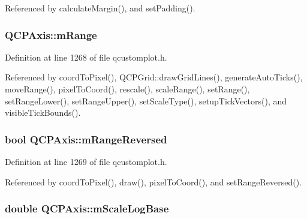 Referenced by calculate\+Margin(), and set\+Padding().

\hypertarget{class_q_c_p_axis_a1ee36773c49062d751560e11f90845f7}{}
\subsubsection[{m\+Range}]{ Q\+C\+P\+Axis\+::m\+Range\hspace{0.3cm}{\ttfamily [protected]}}\label{class_q_c_p_axis_a1ee36773c49062d751560e11f90845f7}


Definition at line 1268 of file qcustomplot.\+h.



Referenced by coord\+To\+Pixel(), Q\+C\+P\+Grid\+::draw\+Grid\+Lines(), generate\+Auto\+Ticks(), move\+Range(), pixel\+To\+Coord(), rescale(), scale\+Range(), set\+Range(), set\+Range\+Lower(), set\+Range\+Upper(), set\+Scale\+Type(), setup\+Tick\+Vectors(), and visible\+Tick\+Bounds().

\hypertarget{class_q_c_p_axis_a5cb034f57aa3d773a9ca55a0931dbf7b}{}
\subsubsection[{m\+Range\+Reversed}]{\setlength{\rightskip}{0pt plus 5cm}bool Q\+C\+P\+Axis\+::m\+Range\+Reversed\hspace{0.3cm}{\ttfamily [protected]}}\label{class_q_c_p_axis_a5cb034f57aa3d773a9ca55a0931dbf7b}


Definition at line 1269 of file qcustomplot.\+h.



Referenced by coord\+To\+Pixel(), draw(), pixel\+To\+Coord(), and set\+Range\+Reversed().

\hypertarget{class_q_c_p_axis_abc727ddb4af745151755d1b5e60d03c3}{}
\subsubsection[{m\+Scale\+Log\+Base}]{\setlength{\rightskip}{0pt plus 5cm}double Q\+C\+P\+Axis\+::m\+Scale\+Log\+Base\hspace{0.3cm}{\ttfamily [protected]}}\label{class_q_c_p_axis_abc727ddb4af745151755d1b5e60d03c3}


